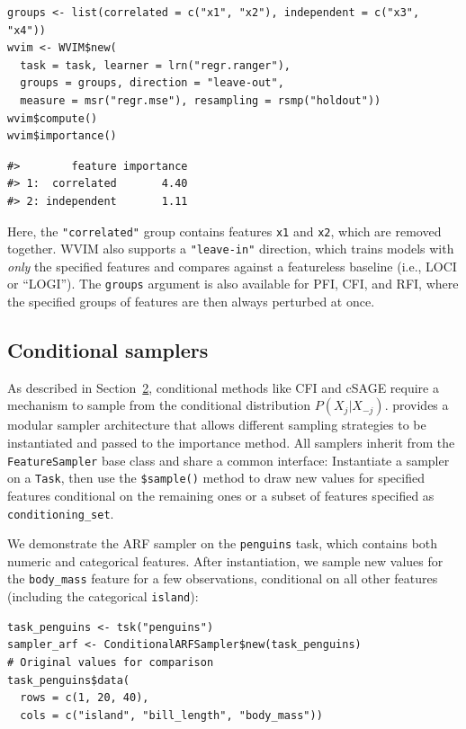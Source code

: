 \begin{verbatim}
groups <- list(correlated = c("x1", "x2"), independent = c("x3", "x4"))
wvim <- WVIM$new(
  task = task, learner = lrn("regr.ranger"),
  groups = groups, direction = "leave-out",
  measure = msr("regr.mse"), resampling = rsmp("holdout"))
wvim$compute()
wvim$importance()
\end{verbatim}

\begin{verbatim}
#>        feature importance
#> 1:  correlated       4.40
#> 2: independent       1.11
\end{verbatim}

Here, the \texttt{"correlated"} group contains features \texttt{x1} and \texttt{x2}, which are removed together.
WVIM also supports a \texttt{"leave-in"} direction, which trains models with \emph{only} the specified features and compares against a featureless baseline (i.e., LOCI or ``LOGI'').
The \texttt{groups} argument is also available for PFI, CFI, and RFI, where the specified groups of features are then always perturbed at once.

\subsection{Conditional samplers}\label{conditional-samplers}

As described in Section~\hyperref[sec-fi-methods]{2}, conditional methods like CFI and cSAGE require a mechanism to sample from the conditional distribution \(P(X_j | X_{-j})\).
 provides a modular sampler architecture that allows different sampling strategies to be instantiated and passed to the importance method.
All samplers inherit from the \texttt{FeatureSampler} base class and share a common interface: Instantiate a sampler on a \texttt{Task}, then use the \texttt{\$sample()} method to draw new values for specified features conditional on the remaining ones or a subset of features specified as \texttt{conditioning\_set}.

We demonstrate the ARF sampler on the \texttt{penguins} task, which contains both numeric and categorical features.
After instantiation, we sample new values for the \texttt{body\_mass} feature for a few observations, conditional on all other features (including the categorical \texttt{island}):

\begin{verbatim}
task_penguins <- tsk("penguins")
sampler_arf <- ConditionalARFSampler$new(task_penguins)
# Original values for comparison
task_penguins$data(
  rows = c(1, 20, 40),
  cols = c("island", "bill_length", "body_mass"))
\end{verbatim}

